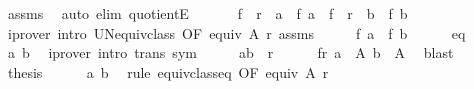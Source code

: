 \begin{isabellebody}
\ assms\ \isamarkupfalse%
\ {\isacharparenleft}{\kern0pt}auto\ elim{\isacharbang}{\kern0pt}{\isacharcolon}{\kern0pt}\ quotientE{\isacharparenright}{\kern0pt}\isanewline
\ \ \isamarkupfalse%
\ \isamarkupfalse%
\ {\isachardoublequoteopen}{\isasymUnion}\ {\isacharparenleft}{\kern0pt}f\ {\isacharbackquote}{\kern0pt}\ r\ {\isacharbackquote}{\kern0pt}{\isacharbackquote}{\kern0pt}\ {\isacharbraceleft}{\kern0pt}a{\isacharbraceright}{\kern0pt}{\isacharparenright}{\kern0pt}\ {\isacharequal}{\kern0pt}\ f\ a{\isachardoublequoteclose}\ {\isachardoublequoteopen}{\isasymUnion}\ {\isacharparenleft}{\kern0pt}f\ {\isacharbackquote}{\kern0pt}\ r\ {\isacharbackquote}{\kern0pt}{\isacharbackquote}{\kern0pt}\ {\isacharbraceleft}{\kern0pt}b{\isacharbraceright}{\kern0pt}{\isacharparenright}{\kern0pt}\ {\isacharequal}{\kern0pt}\ f\ b{\isachardoublequoteclose}\isanewline
\ \ \ \ \isamarkupfalse%
\ {\isacharparenleft}{\kern0pt}iprover\ intro{\isacharcolon}{\kern0pt}\ UN{\isacharunderscore}{\kern0pt}equiv{\isacharunderscore}{\kern0pt}class\ {\isacharbrackleft}{\kern0pt}OF\ {\isacartoucheopen}equiv\ A\ r{\isacartoucheclose}{\isacharbrackright}{\kern0pt}\ assms{\isacharparenright}{\kern0pt}{\isacharplus}{\kern0pt}\isanewline
\ \ \isamarkupfalse%
\ \isamarkupfalse%
\ {\isachardoublequoteopen}f\ a\ {\isacharequal}{\kern0pt}\ f\ b{\isachardoublequoteclose}\isanewline
\ \ \ \ \isamarkupfalse%
\ eq\ \isamarkupfalse%
\ a\ b\ \isamarkupfalse%
\ {\isacharparenleft}{\kern0pt}iprover\ intro{\isacharcolon}{\kern0pt}\ trans\ sym{\isacharparenright}{\kern0pt}\isanewline
\ \ \isamarkupfalse%
\ \isamarkupfalse%
\ {\isachardoublequoteopen}{\isacharparenleft}{\kern0pt}a{\isacharcomma}{\kern0pt}b{\isacharparenright}{\kern0pt}\ {\isasymin}\ r{\isachardoublequoteclose}\isanewline
\ \ \ \ \isamarkupfalse%
\ fr\ {\isacartoucheopen}a\ {\isasymin}\ A{\isacartoucheclose}\ {\isacartoucheopen}b\ {\isasymin}\ A{\isacartoucheclose}\ \isamarkupfalse%
\ blast\isanewline
\ \ \isamarkupfalse%
\ \isamarkupfalse%
\ {\isacharquery}{\kern0pt}thesis\isanewline
\ \ \ \ \isamarkupfalse%
\ a\ b\ \isamarkupfalse%
\ {\isacharparenleft}{\kern0pt}rule\ equiv{\isacharunderscore}{\kern0pt}class{\isacharunderscore}{\kern0pt}eq\ {\isacharbrackleft}{\kern0pt}OF\ {\isacartoucheopen}equiv\ A\ r{\isacartoucheclose}{\isacharbrackright}{\kern0pt}{\isacharparenright}{\kern0pt}\isanewline

\end{isabellebody}

